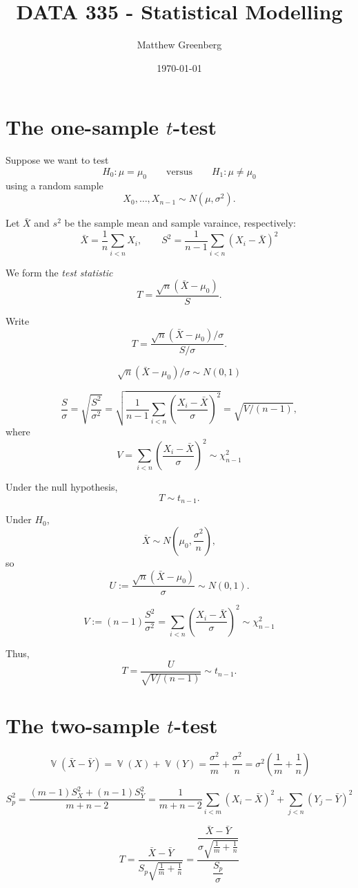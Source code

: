\documentclass{amsart}
\title{DATA 335 - Statistical Modelling}
\author{Matthew Greenberg}
\date{\today}
\DeclareMathOperator{\Var}{\mathbb{V}}
\begin{document}
\maketitle

\section{The one-sample $t$-test}

Suppose we want to test
$$
H_0:\mu=\mu_0\qquad\text{versus}\qquad
H_1:\mu\neq\mu_0
$$
using a random sample
$$
X_0,\ldots,X_{n-1}\sim N(\mu,\sigma^2).
$$

Let $\bar{X}$ and $s^2$ be the sample mean and sample varaince, respectively:
$$
\bar{X} = \frac1n\sum_{i < n} X_i,\qquad
S^2 = \frac1{n-1}\sum_{i < n}(X_i - \bar{X})^2
$$

We form the \emph{test statistic}
$$
T = \frac{\sqrt{n}(\bar{X} - \mu_0)}{S}.
$$

Write
$$
T = \frac{\sqrt{n}(\bar{X} - \mu_0)/\sigma}{S/\sigma}.
$$

$$
\sqrt{n}(\bar{X} - \mu_0)/\sigma\sim N(0, 1)
$$

$$
\frac{S}{\sigma} = \sqrt{\frac{S^2}{\sigma^2}}
= \sqrt{\frac1{n-1}\sum_{i < n}\left(\frac{X_i - \bar{X}}{\sigma}\right)^2}
= \sqrt{V/(n-1)},
$$
where
$$
V = \sum_{i < n}\left(\frac{X_i - \bar{X}}{\sigma}\right)^2\sim\chi^2_{n-1}
$$

Under the null hypothesis,
$$
T\sim t_{n-1}.
$$

Under $H_0$,
$$
\bar{X}\sim N\left(\mu_0,\frac{\sigma^2}{n}\right),
$$
so
$$
U := \frac{\sqrt{n}(\bar{X} - \mu_0)}{\sigma} \sim N(0, 1).
$$

$$
V := (n-1)\frac{S^2}{\sigma^2} =
\sum_{i < n}\left(\frac{X_i - \bar{X}}{\sigma}\right)^2
\sim \chi^2_{n-1}
$$

Thus,
$$
T = \frac{U}{\sqrt{V/(n-1)}}\sim t_{n-1}.
$$

\section{The two-sample $t$-test}

$$
\Var(\bar{X} - \bar{Y}) = \Var(X) + \Var(Y)
= \frac{\sigma^2}{m} + \frac{\sigma^2}{n}
= \sigma^2\left(\frac{1}{m} + \frac{1}{n}\right)
$$

$$
S_p^2 = \frac{(m-1)S_X^2 + (n-1)S_Y^2}{m + n - 2}
= \frac1{m + n - 2}\sum_{i < m}(X_i - \bar{X})^2 + \sum_{j < n}(Y_j - \bar{Y})^2
$$

$$
T = \frac{\bar{X} - \bar{Y}}{S_p\sqrt{\frac1m + \frac1n}}
= \frac{\dfrac{\bar{X} - \bar{Y}}{\sigma\sqrt{\frac1m + \frac1n}}}{\dfrac{S_p}{\sigma}}
$$
\end{document}
